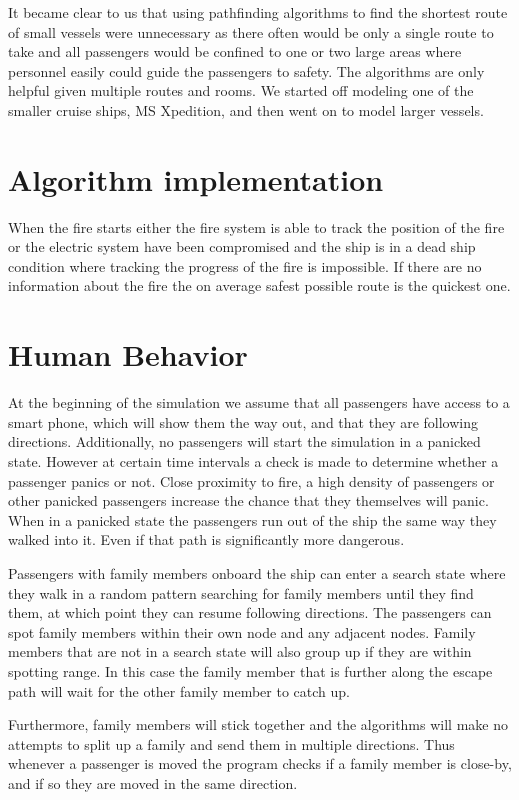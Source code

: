 It became clear to us that using pathfinding algorithms to find the shortest route of small vessels were unnecessary as  there often would be only a single route to take and all passengers would be confined to one or two large areas where personnel easily could guide the passengers to safety. The algorithms are only helpful given multiple routes and rooms. We started off modeling one of the smaller cruise ships, MS Xpedition, and then went on to model larger vessels.

\section{Algorithm implementation}

When the fire starts either the fire system is able to track the position of the fire or the electric system have been compromised and the ship is in a dead ship condition where tracking the progress of the fire is impossible. If there are no information about the fire the on average safest possible route is the quickest one. 




\section{Human Behavior}

At the beginning of the simulation we assume that all passengers have access to a smart phone, which will show them the way out, and that they are following directions. Additionally, no passengers will start the simulation in a panicked state. However at certain time intervals a check is made to determine whether a passenger panics or not. Close proximity to fire, a high density of passengers or other panicked passengers increase the chance that they themselves will panic. When in a panicked state the passengers run out of the ship the same way they walked into it. Even if that path is significantly more dangerous.

Passengers with family members onboard the ship can enter a search state where they walk in a random pattern searching for family members until they find them, at which point they can resume following directions. The passengers can spot family members within their own node and any adjacent nodes. Family members that are not in a search state will also group up if they are within spotting range. In this case the family member that is further along the escape path will wait for the other family member to catch up.

Furthermore, family members will stick together and the algorithms will make no attempts to split up a family and send them in multiple directions. Thus whenever a passenger is moved the program checks if a family member is close-by, and if so they are moved in the same direction.



